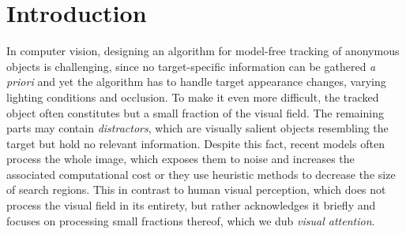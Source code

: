 \section{Introduction}
    In computer vision, designing an algorithm for model-free tracking of anonymous objects is challenging, since no target-specific information can be gathered \emph{a priori} and yet the algorithm has to handle target appearance changes, varying lighting conditions and occlusion. 
    To make it even more difficult, the tracked object often constitutes but a small fraction of the visual field. 
    The remaining parts may contain \emph{distractors}, which are visually salient objects resembling the target but hold no relevant information. 
    Despite this fact, recent models often process the whole image,
    which exposes them to noise
    and increases the associated computational cost or they use heuristic methods to decrease the size of search regions. 
    This in contrast to human visual perception, which does not process the visual field in its entirety, but rather acknowledges it briefly and focuses on processing small fractions thereof, which we dub \emph{visual attention}.
    
